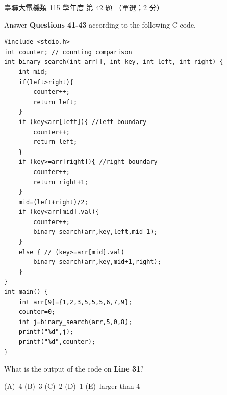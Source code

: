 \begin{pastexam}[label={px:ust-115-ee-ds-42}]{臺聯大電機類 115 學年度 第 42 題}
（單選；2 分）

Answer \textbf{Questions 41-43} according to the following C code.
\begin{verbatim}
#include <stdio.h>
int counter; // counting comparison
int binary_search(int arr[], int key, int left, int right) {
    int mid;
    if(left>right){
        counter++;
        return left;
    }
    if (key<arr[left]){ //left boundary
        counter++;
        return left;
    }
    if (key>=arr[right]){ //right boundary
        counter++;
        return right+1;
    }
    mid=(left+right)/2;
    if (key<arr[mid].val){
        counter++;
        binary_search(arr,key,left,mid-1);
    }
    else { // (key>=arr[mid].val)
        binary_search(arr,key,mid+1,right);
    }
}
int main() {
    int arr[9]={1,2,3,5,5,5,6,7,9};
    counter=0;
    int j=binary_search(arr,5,0,8);
    printf("%d",j);
    printf("%d",counter);
}
\end{verbatim}

What is the output of the code on \textbf{Line 31}?

(A)~4 \qquad (B)~3 \qquad (C)~2 \qquad (D)~1 \qquad (E)~larger than 4
\end{pastexam}


